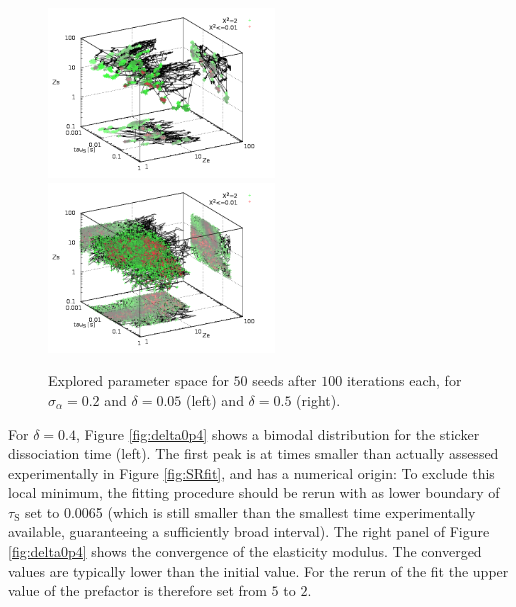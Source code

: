 \documentclass[  superscriptaddress]{revtex4}
\begin{document}
\begin{figure}
  \centering
  \includegraphics*[width=6cm]{../Demos/demodata/img/Chi2Landscape_0p2_0p05.png}
  \includegraphics*[width=6cm]{../Demos/demodata/img/Chi2Landscape_0p2_0p2.png}
  \caption{Explored parameter space for $50$ seeds after $100$ iterations each, for $\sigma_\alpha=0.2$ and $\delta=0.05$ (left) and $\delta=0.5$ (right).}
  \label{fig:Chi2scape}
\end{figure}

For $\delta=0.4$, Figure \ref{fig:delta0p4} shows a bimodal distribution for the sticker dissociation time (left). The first peak is at times smaller than actually assessed experimentally in Figure \ref{fig:SRfit}, and has a numerical origin: To exclude this local minimum, the fitting procedure should be rerun with as lower boundary of $\tau_\mathrm{S}$ set to 0.0065 (which is still smaller than the smallest time experimentally available, guaranteeing a sufficiently broad interval).  
The right panel of Figure \ref{fig:delta0p4} shows the convergence of the elasticity modulus.
The converged values are typically lower than the initial value.
For the rerun of the fit the upper value of the prefactor is therefore set from $5$ to $2$.
\end{document}
